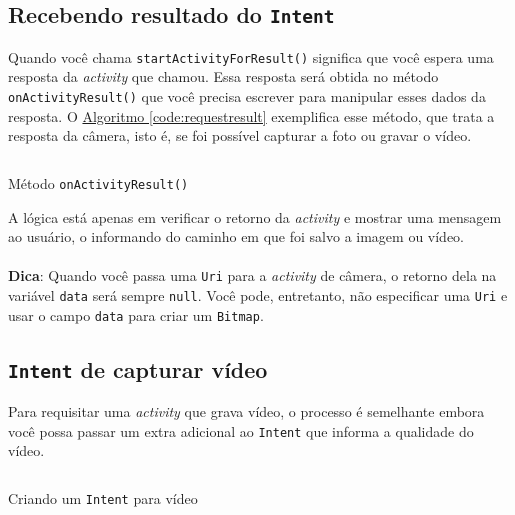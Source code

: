 \documentclass[a4paper,12pt,brazil,oneside]{book}
\begin{document}
	\subsection{Recebendo resultado do \texttt{Intent}}
		
		Quando você chama \texttt{startActivityForResult()} significa que você espera uma resposta da \emph{activity} que chamou. Essa resposta será obtida no método \texttt{onActivityResult()} que você precisa escrever para manipular esses dados da resposta. O \hyperref[code:requestresult]{Algoritmo \ref*{code:requestresult}} exemplifica esse método, que trata a resposta da câmera, isto é, se foi possível capturar a foto ou gravar o vídeo.

		\begin{listing}[H]
		\inputminted[linenos=true,fontsize=\small,frame=lines, framesep=2mm, tabsize=2,numbersep=5pt]{java}{src/api/camera/requestresult.java}
		\caption{Método \texttt{onActivityResult()}}
		\label{code:requestresult}
		\end{listing} 		

		A lógica está apenas em verificar o retorno da \emph{activity} e mostrar uma mensagem ao usuário, o informando do caminho em que foi salvo a imagem ou vídeo.  

		\begin{framed}
\paragraph{}\textbf{Dica}: Quando você passa uma \texttt{Uri} para a \emph{activity} de câmera, o retorno dela na variável \texttt{data} será sempre \texttt{null}. Você pode, entretanto, não especificar uma \texttt{Uri} e usar o campo \texttt{data} para criar um \texttt{Bitmap}.
\textit{ }
\end{framed}

	\subsection{\texttt{Intent} de capturar vídeo}

		Para requisitar uma \emph{activity} que grava vídeo, o processo é semelhante embora você possa passar um extra adicional ao \texttt{Intent} que informa a qualidade do vídeo.

		\begin{listing}[H]
		\inputminted[linenos=true,fontsize=\small,frame=lines, framesep=2mm, tabsize=2,numbersep=5pt]{java}{src/api/camera/recordintent.java}
		\caption{Criando um \texttt{Intent} para vídeo}
		\label{code:recordintent}
		\end{listing} 		
		
\end{document}
